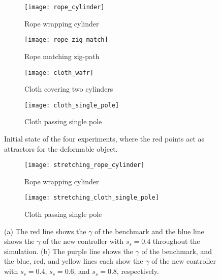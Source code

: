 \begin{figure}[t]
\begin{subfigure}{.24\textwidth}
  \centering
  \texttt{[image: rope\_cylinder]}
  \caption{Rope wrapping cylinder}
  \label{Fig: scene_1_rope_zig_match}
\end{subfigure}%
\vspace{0.3cm}
\begin{subfigure}{.24\textwidth}
  \centering
  \texttt{[image: rope\_zig\_match]}
  \caption{Rope matching zig-path}
  \label{Fig: scene_2_rope_zigzag}
\end{subfigure}
\begin{subfigure}{.24\textwidth}
  \centering
  \texttt{[image: cloth\_wafr]}
  \caption{Cloth covering two cylinders}
  \label{Fig: scene_3_cloth_wafr}
\end{subfigure}
\begin{subfigure}{.24\textwidth}
  \centering
  \texttt{[image: cloth\_single\_pole]}
  \caption{Cloth passing single pole}
  \label{Fig: scene_4_cloth_single_pole}
\end{subfigure}
\caption{Initial state of the four experiments, where the red points act as attractors for the deformable object.}
\label{Fig: experimental_setup_scene}
\end{figure}










\begin{figure}[t]
\begin{subfigure}{.24\textwidth}
  \centering
  \texttt{[image: stretching\_rope\_cylinder]}
  \caption{Rope wrapping cylinder}
  \label{Fig: stretching factor scene_rope_cylinder}
\end{subfigure}
\begin{subfigure}{.24\textwidth}
  \centering
  \texttt{[image: stretching\_cloth\_single\_pole]}
  \caption{Cloth passing single pole}
  \label{Fig: stretching factor scene_cloth_single_pole}
\end{subfigure}
\caption{(a) The red line shows the $\gamma$ of the benchmark and the blue line shows the $\gamma$ of the new controller with $s_s = 0.4$ throughout the simulation. (b) The purple line shows the $\gamma$ of the benchmark, and the blue, red, and yellow lines each show the $\gamma$ of the new controller with $s_s = 0.4$, $s_s = 0.6$, and $s_s = 0.8$, respectively.}
\label{Fig: experiment_stretching_factor}
\end{figure}




